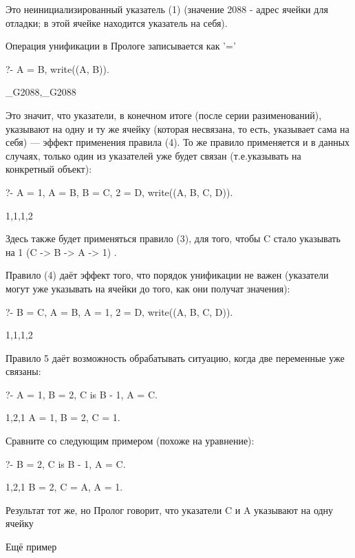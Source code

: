 \documentclass[a4paper]{book}
\def\te{т.\thinspace е.}
\begin{document}
Это неинициализированный указатель (1) (значение 2088 - адрес
ячейки для отладки; в этой ячейке находится указатель на себя).

Операция унификации в Прологе записывается как '='

\begin{example}{}{}
?- A = B, write((A, B)).

_G2088,_G2088
\end{example}

Это значит, что указатели, в конечном итоге (после серии
разименований), указывают на одну и ту же ячейку (которая
несвязана, то есть, указывает сама на себя) --- эффект применения
правила (4). То же правило применяется и в данных случаях, только
один из указателей уже будет связан (\te указывать на конкретный
объект):

\begin{example}{}{}
?- A = 1, A = B, B = C, 2 = D, write((A, B, C, D)).

1,1,1,2
\end{example}

Здесь также будет применяться правило (3), для того, чтобы C
стало указывать на 1 (C -> B -> A -> 1) .

Правило (4) даёт эффект того, что порядок унификации не важен
(указатели могут уже указывать на ячейки до того, как они получат
значения):

\begin{example}{}{}
?- B = C, A = B, A = 1, 2 = D, write((A, B, C, D)).              

1,1,1,2
\end{example}

Правило 5 даёт возможность обрабатывать ситуацию, когда две
переменные уже связаны:

\begin{example}{}{}
?- A = 1, B = 2, C is B - 1, A = C.

1,2,1
A = 1,
B = 2,
C = 1.
\end{example}

Сравните со следующим примером (похоже на уравнение):

\begin{example}{}{}
?- B = 2, C is B - 1, A = C.

1,2,1
B = 2,
C = A, A = 1.
\end{example}

Результат тот же, но Пролог говорит, что указатели C и A
указывают на одну ячейку

Ещё пример
\end{document}
